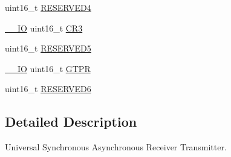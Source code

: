 \begin{DoxyCompactItemize}
\item 
uint16\-\_\-t \hyperlink{struct_u_s_a_r_t___type_def_a6ac527c7428ad8807a7740c1f33f0351}{R\-E\-S\-E\-R\-V\-E\-D4}
\item 
\hyperlink{group___c_m_s_i_s__core__definitions_gaec43007d9998a0a0e01faede4133d6be}{\-\_\-\-\_\-\-I\-O} uint16\-\_\-t \hyperlink{struct_u_s_a_r_t___type_def_a2b9d1df38cb1d745305c8190a8707a0f}{C\-R3}
\item 
uint16\-\_\-t \hyperlink{struct_u_s_a_r_t___type_def_aa893512291681dfbecc5baa899cfafbf}{R\-E\-S\-E\-R\-V\-E\-D5}
\item 
\hyperlink{group___c_m_s_i_s__core__definitions_gaec43007d9998a0a0e01faede4133d6be}{\-\_\-\-\_\-\-I\-O} uint16\-\_\-t \hyperlink{struct_u_s_a_r_t___type_def_abe51502097b1fd281d0a2a1b157d769e}{G\-T\-P\-R}
\item 
uint16\-\_\-t \hyperlink{struct_u_s_a_r_t___type_def_acd89bb1cba0381c2be8a551e6d14e9f7}{R\-E\-S\-E\-R\-V\-E\-D6}
\end{DoxyCompactItemize}


\subsection{Detailed Description}
Universal Synchronous Asynchronous Receiver Transmitter. 

